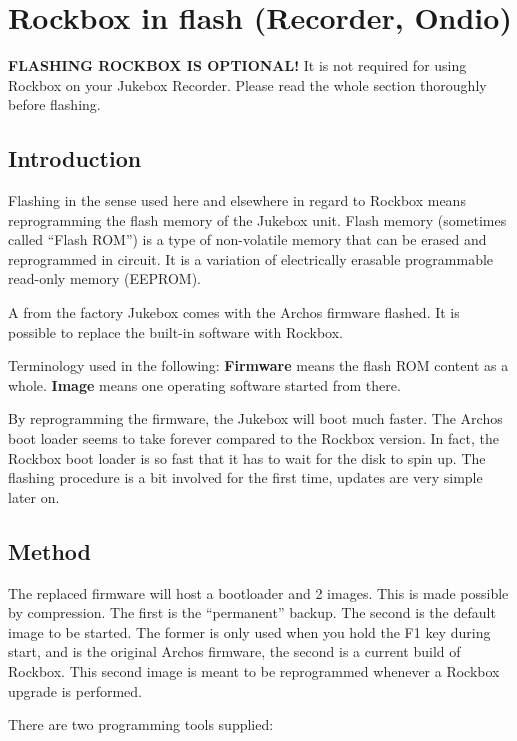 \section{\label{ref:Rockboxinflash}Rockbox in flash (Recorder, Ondio)}
\textbf{FLASHING ROCKBOX IS OPTIONAL!} It is not required for using
Rockbox on your Jukebox Recorder. Please read the whole section
thoroughly before flashing.

\subsection{\label{ref:PartISection61}Introduction}
Flashing in the sense used here and elsewhere in regard to Rockbox means
reprogramming the flash memory of the Jukebox unit. Flash memory
(sometimes called ``Flash ROM'') is a type of
non{}-volatile memory that can be erased and reprogrammed in circuit. It is a variation of electrically erasable
programmable read{}-only memory (EEPROM). 

A from the factory Jukebox comes with the Archos firmware flashed. It is
possible to replace the built{}-in software with Rockbox. 

Terminology used in the following:\newline
\textbf{Firmware} means the flash ROM content as a whole.\newline
\textbf{Image} means one operating software started from there. 

By reprogramming the firmware,  the Jukebox will boot much faster. The
Archos boot loader seems to take forever compared to the Rockbox
version. In fact, the Rockbox boot loader is so fast that it has to
wait for the disk to spin up.  The flashing procedure is a bit involved
for the first time, updates are very simple later on. 

\subsection{\label{ref:Method}Method}
The replaced firmware will host a bootloader and 2 images. This is made
possible by compression. The first is the
``permanent'' backup. The second is the
default image to be started.  The former is only used when you hold the
F1 key during start, and is the original Archos firmware, the second is
a current build of Rockbox. This second image is meant to be
reprogrammed whenever a Rockbox upgrade is performed.

There are two programming tools supplied: 

